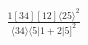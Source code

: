 \documentclass[varwidth, border=5pt]{standalone}
\begin{document}
\begin{my}
$\begin{gathered}
\scriptscriptstyle\frac{1[34][12]⟨25⟩^2}{⟨34⟩⟨5|1+2|5]^2}
\end{gathered}$
\end{my}
\end{document}
